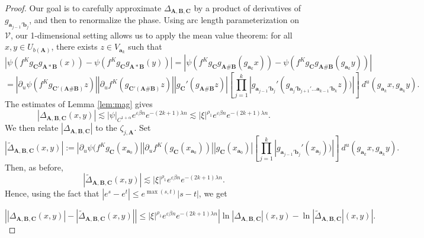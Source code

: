 \documentclass[a4paper]{article}
\theoremstyle{definition}
\begin{document}
\begin{proof}

Our goal is to carefully approximate $\Delta_{\mathbf{A},\mathbf{B},\mathbf{C}}$ by a product of derivatives of $g_{\mathbf{a}_{j-1}'\mathbf{b}_j}$, and then to renormalize the phase. Using arc length parameterization on $\mathcal{V}$, our 1-dimensional setting allows us to apply the mean value theorem: for all $x,y \in U_{b(\mathbf{A})}$, there exists $z \in V_{{\mathbf{a}_k}}$ such that
$$ |\psi( f^K g_{\mathbf{C}} g_{\mathbf{A}* \mathbf{B}} (x) ) -  \psi( f^K g_{\mathbf{C}} g_{\mathbf{A}* \mathbf{B}} (y) )| = |\psi( f^K g_{\mathbf{C}} g_{\mathbf{A} \# \mathbf{B}} (g_{\mathbf{a}_k} x) ) -  \psi( f^K g_{\mathbf{C}} g_{\mathbf{A} \# \mathbf{B}} (g_{\mathbf{a}_k} y) )|$$ $$ = |\partial_u \psi(  f^K g_{\mathbf{C}'(\mathbf{A} \# \mathbf{B})} z )| |\partial_u f^K(g_{\mathbf{C}'(\mathbf{A} \# \mathbf{B})} z )| |g_{\mathbf{C}}'(g_{\mathbf{A} \# \mathbf{B} } z)| \left[ \prod_{j=1}^{k} |g_{\mathbf{a}_{j-1}'\mathbf{b}_j}'(g_{\mathbf{a}_j' \mathbf{b}_{j+1}' \dots \mathbf{a}_{k-1}' \mathbf{b}_k}z) )| \right]  \ d^u(g_{\mathbf{a}_k} x,g_{\mathbf{a}_k} y) .$$
The estimates of Lemma \ref{lem:mag} gives
$$ \left| {\Delta_{\mathbf{A},\mathbf{B},\mathbf{C}}(x,y)} \right| \lesssim  |\psi|_{C^{1+\alpha}} e^{\varepsilon \beta n} e^{- (2k+1) \lambda n} \lesssim |\xi|^{\rho_1}  e^{\varepsilon \beta n} e^{- (2k+1) \lambda n}  .$$
We then relate $|\Delta_{\mathbf{A},\mathbf{B}, \mathbf{C}}|$ to the $\zeta_{j,\mathbf{A}}$. Set $$ |\tilde{\Delta}_{\mathbf{A},\mathbf{B},\mathbf{C}}(x,y)| := |\partial_u \psi(  f^K g_{\mathbf{C}}(x_{\mathbf{a}_0} )| |\partial_u f^K(g_{\mathbf{C}} (x_{\mathbf{a}_0}) )| |g_{\mathbf{C}}(x_{\mathbf{a}_0})| \left[ \prod_{j=1}^{k} |g_{\mathbf{a}_{j-1}'\mathbf{b}_j}'(x_{\mathbf{a}_j}) )| \right]  \ d^u(g_{\mathbf{a}_k}x,g_{\mathbf{a}_k}y).$$
Then, as before, $$ \left| {\tilde{\Delta}_{\mathbf{A},\mathbf{B},\mathbf{C}}(x,y)} \right| \lesssim |\xi|^{\rho_1}  e^{\varepsilon \beta n} e^{- (2k+1) \lambda n}  .$$ 
Hence, using the fact that $|e^{s} - e^{t}| \leq e^{\max(s,t)} |s-t| $, we get

$$ \left| |\Delta_{\mathbf{A},\mathbf{B},\mathbf{C}}(x,y)| - |\tilde{\Delta}_{\mathbf{A},\mathbf{B},\mathbf{C}}(x,y)| \right| \leq |\xi|^{\rho_1} e^{\varepsilon \beta n} e^{-(2k+1)\lambda n} \left| \ln |\Delta_{\mathbf{A},\mathbf{B},\mathbf{C}}|(x,y) - \ln |\tilde{\Delta}_{\mathbf{A},\mathbf{B},\mathbf{C}}|(x,y) \right|.$$


\end{proof}
\end{document}
